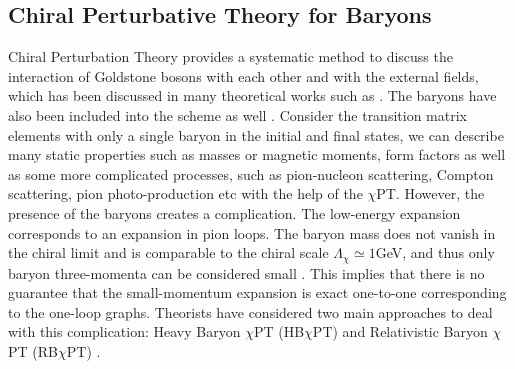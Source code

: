 \subsection{Chiral Perturbative Theory for Baryons}
\label{C3S1SS3}

Chiral Perturbation Theory provides a systematic method to discuss the interaction of Goldstone bosons with each other and with the external fields, which has been discussed in many theoretical works such as \cite{Gasser1984,Gasser1985}. The baryons have also been included into the scheme as well \cite{Bernard1992}. Consider the transition matrix elements with only a single baryon in the initial and final states, we can describe many static properties such as masses or magnetic moments, form factors as well as some more complicated processes, such as pion-nucleon scattering, Compton scattering, pion photo-production etc with the help of the $\chi$PT. However, the presence of the baryons creates a complication. The low-energy expansion corresponds to an expansion in pion loops. The baryon mass does not vanish in the chiral limit and is comparable to the chiral scale $\Lambda_\chi\simeq 1$GeV, and thus only baryon three-momenta can be considered small \cite{Bernard1993}. This implies that there is no guarantee that the small-momentum expansion is exact one-to-one corresponding to the one-loop graphs. Theorists have considered two main approaches to deal with this complication: Heavy Baryon $\chi$PT (HB$\chi$PT) \cite{Jenkins1991a,Jenkins1991b} and Relativistic Baryon $\chi$PT (RB$\chi$PT) \cite{Ellis2003}.

